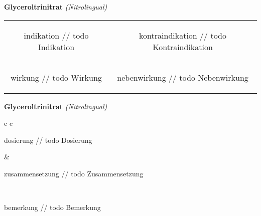 \documentclass[12pt]{beamer}
\begin{document}
\begin{frame}{
    \textbf{Glyceroltrinitrat}
    \textit{(Nitrolingual)}
}
    \begin{tabular}{c c}
        \begin{beamercolorbox}[wd=\boxwidth\textwidth,ht=\boxheight\textheight,sep=1em]{indikation}
        // todo Indikation
        \end{beamercolorbox} & 
        \begin{beamercolorbox}[wd=\boxwidth\textwidth,ht=\boxheight\textheight,sep=1em]{kontraindikation}
        // todo Kontraindikation 
        \end{beamercolorbox} \\
        \begin{beamercolorbox}[wd=\boxwidth\textwidth,ht=\boxheight\textheight,sep=1em]{wirkung}
        // todo Wirkung
        \end{beamercolorbox} & 
        \begin{beamercolorbox}[wd=\boxwidth\textwidth,ht=\boxheight\textheight,sep=1em]{nebenwirkung}
        // todo Nebenwirkung
        \end{beamercolorbox} \\
    \end{tabular}
\end{frame}

\begin{frame}{
    \textbf{Glyceroltrinitrat}
    \textit{(Nitrolingual)}
}
    \begin{tabular}{c c}
        \begin{beamercolorbox}[wd=\boxwidth\textwidth,ht=\boxheight\textheight,sep=1em]{dosierung}
        // todo Dosierung
        \end{beamercolorbox} & 
        \begin{beamercolorbox}[wd=\boxwidth\textwidth,ht=\boxheight\textheight,sep=1em]{zusammensetzung}
        // todo Zusammensetzung
        \end{beamercolorbox} \\
        \begin{beamercolorbox}[wd=\textwidth,ht=\boxheight\textheight,sep=1em]{bemerkung}
        // todo Bemerkung
        \end{beamercolorbox} \\
    \end{tabular}
\end{frame}
\end{document}
